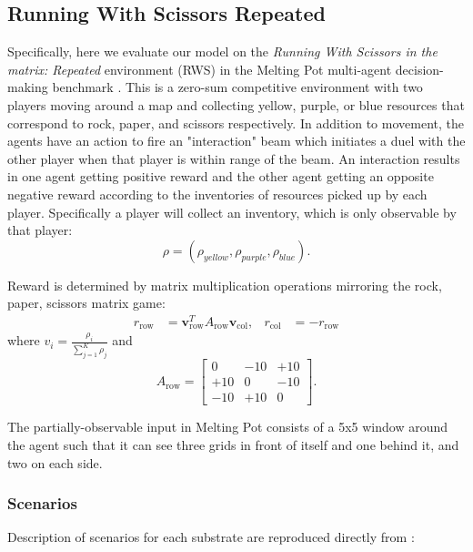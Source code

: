 \documentclass{article} %
\begin{document}
\subsection{Running With Scissors Repeated}

Specifically, here we evaluate our model on the \textit{Running With Scissors in the matrix: Repeated} environment (RWS) in the Melting Pot multi-agent decision-making benchmark \citep{agapiou2022melting}. This is a zero-sum competitive environment with two players moving around a map and collecting yellow, purple, or blue resources that correspond to rock, paper, and scissors respectively. In addition to movement, the agents have an action to fire an "interaction" beam which initiates a duel with the other player when that player is within range of the beam. An interaction results in one agent getting positive reward and the other agent getting an opposite negative reward according to the inventories of resources picked up by each player. Specifically a player will collect an inventory, which is only observable by that player:
\[
\rho = (\rho_{yellow}, \rho_{purple}, \rho_{blue}).
\]

Reward is determined by matrix multiplication operations mirroring the rock, paper, scissors matrix game:
\begin{align*}
r_{\text{row}} &= \mathbf{v}_{\text{row}}^T A_{\text{row}} \mathbf{v}_{\text{col}}, &
r_{\text{col}} &= -r_{\text{row}}
\end{align*}
where \( v_i = \frac{\rho_i}{\sum_{j=1}^K \rho_j} \) and
\[
A_{\text{row}} = 
\begin{bmatrix}
0 & -10 & +10 \\
+10 & 0 & -10 \\
-10 & +10 & 0
\end{bmatrix}.
\]

The partially-observable input in Melting Pot consists of a 5x5 window around the agent such that it can see three grids in front of itself and one behind it, and two on each side.

\subsubsection{Scenarios}

Description of scenarios for each substrate are reproduced directly from \citep{agapiou2022melting}:
\end{document}
